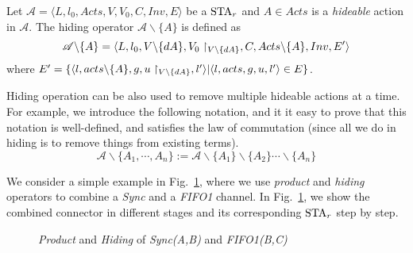 \begin{definition}[Hiding]
Let $\mathscr{A}= \langle L, l_0, Acts, V, V_0, C, Inv, E\rangle$ be a $\mbox{STA}_r$ and $A\in Acts$ is a \emph{hideable} action in $\mathscr{A}$. The hiding operator $\mathscr{A}\backslash\{A\}$ is defined as
\begin{equation*}
\mathscr{A}\backslash\{A\}
=\langle L, l_0, V\backslash \{dA\}, V_0\restriction_{V\backslash \{dA\}}, C, Acts\backslash\{A\}, Inv, E'\rangle
\end{equation*}
where $E'=\{\langle l, acts\backslash\{A\}, g, u\restriction_{V\backslash \{dA\}}, l'\rangle | \langle l, acts, g, u, l'\rangle\in E\}$.
\end{definition}

Hiding operation can be also used to remove multiple hideable actions at a time. For example, we introduce the following notation, and it it easy to prove that this notation is well-defined, and satisfies the law of commutation (since all we do in hiding is to remove things from existing terms).
\[
    \mathscr{A}\backslash \{A_1,\cdots, A_n\}:=\mathscr{A}\backslash \{A_1\}\backslash\{A_2\}\cdots\backslash \{A_n\}
\]


We consider a simple example in Fig.~\ref{fig:prodsyncandfifo}, where we use \emph{product} and \emph{hiding} operators to combine a \emph{Sync} and a \emph{FIFO1} channel. In Fig.~\ref{fig:prodsyncandfifo}, we show the combined connector in different stages and its corresponding $\mbox{STA}_r$ step by step.

\begin{figure}[H]
    \centering
    \resizebox{.85\textwidth}{!}{
        
    }
    \caption{\emph{Product} and \emph{Hiding} of \emph{Sync(A,B)} and \emph{FIFO1(B,C)}}
    \label{fig:prodsyncandfifo}
\end{figure}


